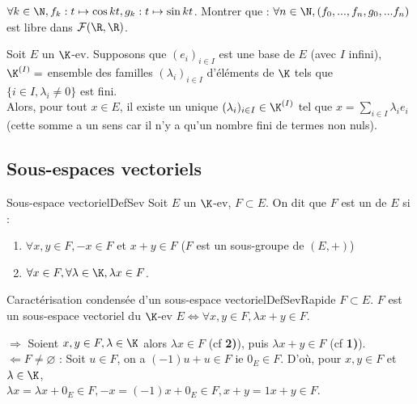 \documentclass[12pt, a4paper]{report}
\begin{document}
\begin{remarque}{}
\begin{exemple}[Exercice]{}
$\forall k \in \N, f_k : t \mapsto \cos kt, g_k : t \mapsto \sin kt$. Montrer que : $\forall n \in \N, (f_0,...,f_n,g_0,...f_n)$ est libre dans $\mathcal{F}(\R,\R)$.
\end{exemple}

\begin{remarque}{}
Soit $E$ un $\K$-ev. Supposons que $(e_i)_{i \in I}$ est une base de $E$ (avec $I$ infini), \\
$\K^{(I)}=$ ensemble des familles $(\lambda_i)_{i \in I}$ d'éléments de $\K$  \ie tels que \\
$\{ i \in I, \lambda_i \ne 0\}$ est fini. \\
Alors, pour tout $x \in E$, il existe un unique $(\lambda_i)_{i \in I} \in \K^{(I)}$ tel que $x = \displaystyle{\sum_{i \in I} \lambda_i e_i}$ (cette somme a un sens car il n'y a qu'un nombre fini de termes non nuls).
\end{remarque}

\end{remarque}


\subsection{Sous-espaces vectoriels}

\begin{definition}{Sous-espace vectoriel}{DefSev}
Soit $E$ un $\K$-ev, $F \subset E$. On dit que $F$ est un  de $E$ si : 
\begin{enumerate}
	\item $\forall x,y \in F, -x \in F$ et $x+y \in F$ ($F$ est un sous-groupe de $(E,+)$)
	\item $\forall x \in F, \forall \lambda \in \K, \lambda x \in F$.
\end{enumerate}
\end{definition}

\begin{proposition}{Caractérisation condensée d'un sous-espace vectoriel}{DefSevRapide}
$F \subset E$. $F$ est un sous-espace vectoriel du $\K$-ev $E \Longleftrightarrow \forall x,y \in F, \lambda x + y \in F$.
\end{proposition}

\begin{demo}{}
$\Longrightarrow$ Soient $x,y \in F, \lambda \in \K$ alors $\lambda x \in F$ (cf \textbf{2)}), puis $\lambda x + y \in F$ (cf \textbf{1)}). \\
$\Longleftarrow F \ne \varnothing$ : Soit $u \in F$, on a $(-1)u + u \in F$ ie $0_E \in F$. D'où, pour $x,y \in F$ et $\lambda \in \K$, \\
$\lambda x = \lambda x + 0_E \in F, -x = (-1)x + 0_E \in F, x+y = 1x+y \in F$.
\end{demo}{}
\end{document}
